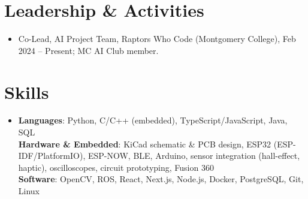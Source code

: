 \documentclass[letterpaper,11pt]{article}
\newcommand{\resumeItemPlain}[1]{
  \item\small{
    {#1 \vspace{-2pt}}
  }
}
\newcommand{\resumeSubHeadingListStart}{\begin{itemize}[leftmargin=*]}
\newcommand{\resumeSubHeadingListEnd}{\end{itemize}}
\begin{document}
\section{Leadership \& Activities}
  \resumeSubHeadingListStart
    \resumeItemPlain{Co-Lead, AI Project Team, Raptors Who Code (Montgomery College), Feb 2024 -- Present; MC AI Club member.}
  \resumeSubHeadingListEnd


\section{Skills}
  \resumeSubHeadingListStart
    \item\small{
      \textbf{Languages}{: Python, C/C++ (embedded), TypeScript/JavaScript, Java, SQL} \\
      \textbf{Hardware \& Embedded}{: KiCad schematic \& PCB design, ESP32 (ESP-IDF/PlatformIO), ESP-NOW, BLE, Arduino, sensor integration (hall-effect, haptic), oscilloscopes, circuit prototyping, Fusion 360} \\
      \textbf{Software}{: OpenCV, ROS, React, Next.js, Node.js, Docker, PostgreSQL, Git, Linux}
    }
  \resumeSubHeadingListEnd


\end{document}
